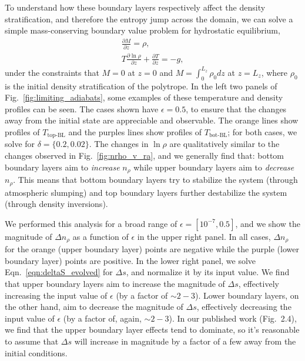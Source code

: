 To understand how these boundary layers respectively affect the density stratification, and therefore the entropy jump across the domain, we can solve a simple mass-conserving boundary value problem for hydrostatic equilibrium, 
\begin{equation}
\begin{split}
\frac{\partial M}{\partial z} = \rho,\\
T\frac{\partial \ln\rho}{\partial z} + \frac{\partial T}{\partial z} = -g,
\end{split}
\end{equation}
under the constraints that $M = 0$ at $z = 0$ and $M = \int_0^{L_z} \rho_0 dz$ at $z = L_z$, where $\rho_0$ is the initial density stratification of the polytrope.
In the left two panels of Fig.~\ref{fig:limiting_adiabats}, some examples of these temperature and density profiles can be seen.
The cases shown have $\epsilon = 0.5$, to ensure that the changes away from the initial state are appreciable and observable.
The orange lines show profiles of $T_{\text{top-BL}}$ and the purples lines show profiles of $T_{\text{bot-BL}}$; for both cases, we solve for $\delta = \{0.2, 0.02\}$.
The changes in $\ln\rho$ are qualitatively similar to the changes observed in Fig.~\ref{fig:nrho_v_ra}, and we generally find that: bottom boundary layers aim to \emph{increase} $n_\rho$ while upper boundary layers aim to \emph{decrease} $n_\rho$.
This means that bottom boundary layers try to stabilize the system (through atmospheric slumping) and top boundary layers further destabilize the system (through density inversions).

We performed this analysis for a broad range of $\epsilon = [10^{-7}, 0.5]$, and we show the magnitude of $\Delta n_\rho$ as a function of $\epsilon$ in the upper right panel.
In all cases, $\Delta n_\rho$ for the orange (upper boundary layer) points are negative while the purple (lower boundary layer) points are positive.
In the lower right panel, we solve Eqn.~\ref{eqn:deltaS_evolved} for $\Delta s$, and normalize it by its input value.
We find that upper boundary layers aim to increase the magnitude of $\Delta s$, effectively increasing the input value of $\epsilon$ (by a factor of $\sim 2-3$).
Lower boundary layers, on the other hand, aim to decrease the magnitude of $\Delta s$, effectively decreasing the input value of $\epsilon$ (by a factor of, again, $\sim 2-3$).
In our published work (Fig.~2.4), we find that the upper boundary layer effects tend to dominate, so it's reasonable to assume that $\Delta s$ will increase in magnitude by a factor of a few away from the initial conditions.

